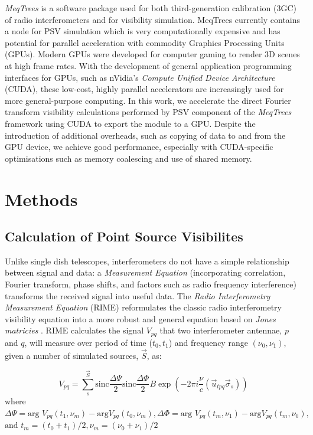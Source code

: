 \emph{MeqTrees} is a software package used for both third-generation
calibration (3GC) of radio interferometers and for  visibility simulation.
MeqTrees currently contains a node for PSV simulation which is very
computationally expensive and has potential for parallel acceleration with
commodity Graphics Processing Units (GPUs). \label{sec:cuda}  Modern GPUs were
developed for computer gaming to render 3D scenes at high frame rates. With
the development of general application programming interfaces for GPUs, such
as nVidia's \emph{Compute Unified Device Architecture} (CUDA), these low-cost,
highly parallel accelerators are increasingly used for more general-purpose
computing. In this work, we accelerate the direct Fourier transform visibility
calculations performed by PSV component of the \emph{MeqTrees} framework using
CUDA to export the module to a GPU.  Despite the introduction of additional
overheads, such as copying of data to and from the GPU device,  we achieve
good performance, especially with CUDA-specific optimisations such as memory
coalescing and  use of shared memory.


\section{Methods}
\subsection{Calculation of Point Source Visibilites}
\label{sec:meqtrees}

Unlike single dish telescopes, interferometers do not have a simple
relationship between signal and data: a \emph{Measurement Equation}
(incorporating correlation, Fourier transform, phase shifts, and factors such
as radio frequency interference) transforms the received signal into useful
data.  The \emph{Radio Interferometry Measurement Equation} (RIME)
reformulates the classic radio interferometry visibility equation into a more
robust and general equation based on \emph{Jones matricies}
\citep{Smirnov2011}. RIME calculates the signal $V_{pq}$ that two
interferometer antennae, $p$ and $q$, will measure over period of time ($t_0,
t_1$)  and  frequency range $(\nu_0, \nu_1)$, given a number of simulated
sources, $\vec{S}$, as:

\begin{equation}
V_{pq} = \sum_s^{\vec{S}}
\mbox{sinc}\frac{\Delta\Psi}{2}\mbox{sinc}\frac{\Delta\Phi}{2}
B\exp\left({-2\pi i\frac{\nu}{c}(\vec{u}_{tpq}\vec\sigma_s)}\right)
\label{eq:RIME}
\end{equation}
where
$\Delta\Psi = \mbox{arg }V_{pq}(t_1,\nu_m) - \mbox{arg
}V_{pq}(t_0,\nu_m), 
\Delta\Phi = \mbox{arg }V_{pq}(t_m,\nu_1) - \mbox{arg
}V_{pq}(t_m,\nu_0),$
$\mbox{and } t_m = (t_0 + t_1)/2, \nu_m = (\nu_0 + \nu_1)/2 $

